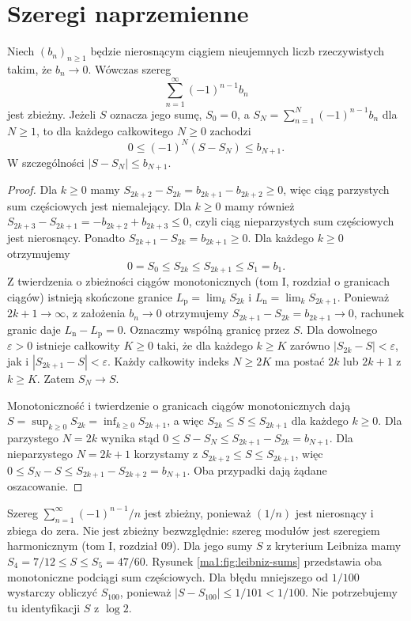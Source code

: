 \section{Szeregi naprzemienne}
\begin{twierdzenie}
\label{ma1:thm:leibniz-series}
Niech $(b_n)_{n\ge1}$ będzie nierosnącym ciągiem nieujemnych liczb rzeczywistych takim, że $b_n\to0$. Wówczas szereg
\[
 \sum_{n=1}^\infty (-1)^{n-1}b_n
\]
jest zbieżny. Jeżeli $S$ oznacza jego sumę, $S_0=0$, a $S_N=\sum_{n=1}^N(-1)^{n-1}b_n$ dla $N\ge1$, to dla każdego całkowitego $N\ge0$ zachodzi
\[
 0\le(-1)^N(S-S_N)\le b_{N+1}.
\]
W szczególności $|S-S_N|\le b_{N+1}$.
\end{twierdzenie}
\begin{proof}
Dla $k\ge0$ mamy $S_{2k+2}-S_{2k}=b_{2k+1}-b_{2k+2}\ge0$, więc ciąg parzystych sum częściowych jest niemalejący. Dla $k\ge0$ mamy również $S_{2k+3}-S_{2k+1}=-b_{2k+2}+b_{2k+3}\le0$, czyli ciąg nieparzystych sum częściowych jest nierosnący. Ponadto $S_{2k+1}-S_{2k}=b_{2k+1}\ge0$. Dla każdego $k\ge0$ otrzymujemy
\[
 0=S_0\le S_{2k}\le S_{2k+1}\le S_1=b_1.
\]
Z twierdzenia o zbieżności ciągów monotonicznych (tom I, rozdział o granicach ciągów) istnieją skończone granice $L_{\mathrm p}=\lim_k S_{2k}$ i $L_{\mathrm n}=\lim_k S_{2k+1}$. Ponieważ $2k+1\to\infty$, z założenia $b_n\to0$ otrzymujemy $S_{2k+1}-S_{2k}=b_{2k+1}\to0$, rachunek granic daje $L_{\mathrm n}-L_{\mathrm p}=0$. Oznaczmy wspólną granicę przez $S$. Dla dowolnego $\varepsilon>0$ istnieje całkowity $K\ge0$ taki, że dla każdego $k\ge K$ zarówno $|S_{2k}-S|<\varepsilon$, jak i $|S_{2k+1}-S|<\varepsilon$. Każdy całkowity indeks $N\ge2K$ ma postać $2k$ lub $2k+1$ z $k\ge K$. Zatem $S_N\to S$.

Monotoniczność i twierdzenie o granicach ciągów monotonicznych dają $S=\sup_{k\ge0}S_{2k}=\inf_{k\ge0}S_{2k+1}$, a więc $S_{2k}\le S\le S_{2k+1}$ dla każdego $k\ge0$. Dla parzystego $N=2k$ wynika stąd $0\le S-S_N\le S_{2k+1}-S_{2k}=b_{N+1}$. Dla nieparzystego $N=2k+1$ korzystamy z $S_{2k+2}\le S\le S_{2k+1}$, więc $0\le S_N-S\le S_{2k+1}-S_{2k+2}=b_{N+1}$. Oba przypadki dają żądane oszacowanie.
\end{proof}
\begin{przyklad}
\label{ma1:ex:alternating-harmonic}
Szereg $\sum_{n=1}^\infty(-1)^{n-1}/n$ jest zbieżny, ponieważ $(1/n)$ jest nierosnący i zbiega do zera. Nie jest zbieżny bezwzględnie: szereg modułów jest szeregiem harmonicznym (tom I, rozdział 09). Dla jego sumy $S$ z kryterium Leibniza mamy
$S_4=7/12\le S\le S_5=47/60$.
Rysunek \ref{ma1:fig:leibniz-sums} przedstawia oba
monotoniczne podciągi sum częściowych.
Dla błędu mniejszego od $1/100$ wystarczy obliczyć $S_{100}$, ponieważ $|S-S_{100}|\le1/101<1/100$. Nie potrzebujemy tu identyfikacji $S$ z $\log 2$.
\end{przyklad}

